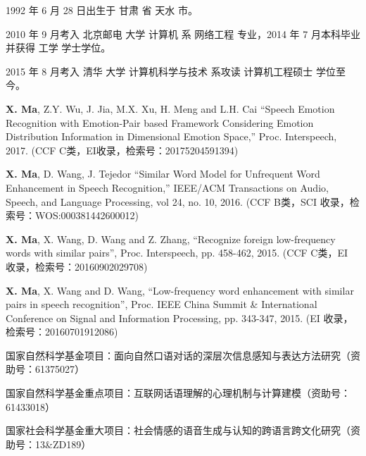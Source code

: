 \begin{resume}


  1992 年 6 月 28 日出生于 甘肃 省 天水 市。

  2010 年 9 月考入 北京邮电 大学 计算机 系 网络工程 专业，2014 年 7 月本科毕业并获得 工学 学士学位。

  2015 年 8 月考入 清华 大学 计算机科学与技术 系攻读 计算机工程硕士 学位至今。


  \begin{publications}
    \item \textbf{X. Ma}, Z.Y. Wu, J. Jia, M.X. Xu, H. Meng and L.H. Cai “Speech Emotion Recognition with Emotion-Pair based Framework Considering Emotion Distribution Information in Dimensional Emotion Space,” Proc. Interspeech, 2017. (CCF C类，EI收录，检索号：20175204591394)
    \item \textbf{X. Ma}, D. Wang, J. Tejedor “Similar Word Model for Unfrequent Word Enhancement in Speech Recognition,” IEEE/ACM Transactions on Audio, Speech, and Language Processing, vol 24, no. 10, 2016. (CCF B类，SCI 收录，检索号：WOS:000381442600012)
    \item \textbf{X. Ma}, X. Wang, D. Wang and Z. Zhang, “Recognize foreign low-frequency words with similar pairs”, Proc. Interspeech, pp. 458-462, 2015. (CCF C类，EI 收录，检索号：20160902029708)
    \item \textbf{X. Ma}, X. Wang and D. Wang, “Low-frequency word enhancement with similar pairs in speech recognition”, Proc. IEEE China Summit \& International Conference on Signal and Information Processing, pp. 343-347, 2015. (EI 收录，检索号：20160701912086)
  \end{publications}

  \begin{achievements}
    \item 国家自然科学基金项目：面向自然口语对话的深层次信息感知与表达方法研究（资助号：61375027）
    \item 国家自然科学基金重点项目：互联网话语理解的心理机制与计算建模（资助号：61433018）
    \item 国家社会科学基金重大项目：社会情感的语音生成与认知的跨语言跨文化研究（资助号：13\&ZD189）
  \end{achievements}


\end{resume}
